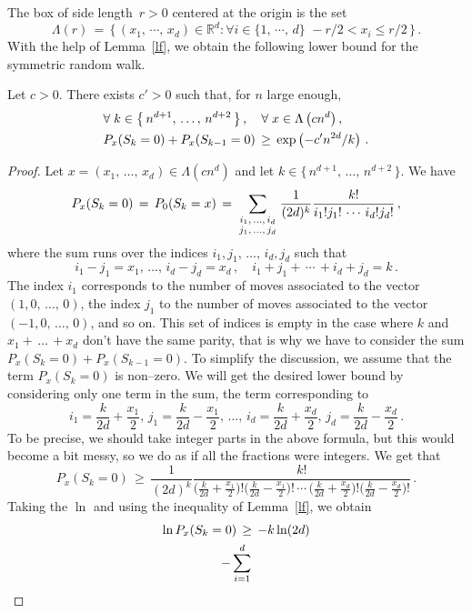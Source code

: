 \documentclass[AHL, Unicode, longabstracts, published]{cedram}
\newcommand{\tatop}[2]{\genfrac{}{}{0pt}{1}{#1}{#2}}
\newcommand*\R{\mathbb{R}}
\newcommand*\La {{\Lambda}}
\let\oldforall\forall
\renewcommand*{\forall}{\mathrel{\oldforall}}
\begin{document}
The box of side length~$r>0$ centered at the origin is the set
\[
\Lambda(r) \,=\, \big\{\,(x_1,\,\cdots,\,x_d)\in\R^d :
\forall i\in \{1,\,\cdots,\,d\}\,\, -r/2<x_i\leq r/2
\,\big\}\,.
\]
With the help of Lemma~\ref{lf}, we obtain the following lower bound for the symmetric random walk.
\begin{lemm}\label{afaire}
Let $c>0$. There exists $c'>0$ such that, for $n$ large enough,
\begin{multline*}
\forall k\in\left\{\,n^{d+1},\,\dots,\,n^{d+2}\,\right\},\quad
\forall x\in\La\left(cn^d\right),\quad\hfill\\ P_x(S_{k}=0)+ P_x(S_{k-1}=0)\,\geq\,\exp\left(-c'n^{2d}/k\right)\,.
\end{multline*}
\end{lemm}
\begin{proof}
Let $x=(x_1,\,\dots,\,x_d)\in \La(cn^d)$ and let $k\in\{\,n^{d+1},\,\dots,\,n^{d+2}\,\}$. We have
\[
P_x(S_{k}=0)\,=\,
P_0(S_{k}=x)\,=\,
\sum_{
\tatop{{i_1,\,\dots,\,i_d} } {{j_1,\,\dots,\,j_d} } }
\frac{1}{(2d)^k}
\frac{k!}{i_1!j_1!\,\cdots\,i_d!j_d!}
\,,
\]
where the sum runs over the indices $i_1,j_1,\,\dots,\,i_d,j_d$ such that
\[
i_1-j_1=x_1,\,\dots,\,i_d-j_d=x_d\,,\quad
i_1+j_1+\,\cdots\,+i_d+j_d=k\,.
\]
The index $i_1$ corresponds to the number of moves associated to the vector $(1,0,\,\dots,\,0)$, the index $j_1$ to the number of moves associated to the vector $(-1,0,\,\dots,\,0)$, and so on. This set of indices is empty in the case where $k$ and $x_1+\,\dots\,+x_d$ don't have the same parity, that is why we have to consider the sum $P_x(S_{k}=0)+ P_x(S_{k-1}=0)$. To simplify the discussion, we assume that the term $P_x(S_{k}=0)$ is non--zero. We will get the desired lower bound by considering only one term in the sum, the term corresponding to
\[
i_1=\frac{k}{2d}+\frac{x_1}{2},\,
j_1=\frac{k}{2d}-\frac{x_1}{2},\,\dots,\, i_d=\frac{k}{2d}+\frac{x_d}{2},\,
j_d=\frac{k}{2d}-\frac{x_d}{2}\,.
\]
To be precise, we should take integer parts in the above formula, but this would become a bit messy, so we do as if all the fractions were integers. We get that
\[
P_x(S_{k}=0)\,\geq\,
\frac{1}{(2d)^k}
\frac{k!}{
\Big(\displaystyle \frac{k}{2d}+\frac{x_1}{2}\Big)!
\Big(\displaystyle \frac{k}{2d}-\frac{x_1}{2}\Big)!
\,\cdots\,
\Big(\frac{k}{2d}+\frac{x_d}{2}\Big)!
\Big(\frac{k}{2d}-\frac{x_d}{2}\Big)! }
\,.
\]
Taking the $\ln$ and using the inequality of Lemma~\ref{lf}, we obtain
\begin{multline*}
\ln P_x(S_{k}=0)\,\geq\,-k\ln (2d)\hfill\\ -\sum_{i=1}^d

\end{multline*}
\end{proof}
\end{document}
